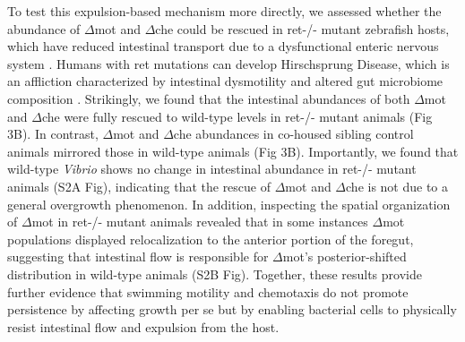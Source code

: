 To test this expulsion-based mechanism more directly, we assessed whether the abundance of $\Delta$mot and $\Delta$che could be rescued in ret-/- mutant zebrafish hosts, which have reduced intestinal transport due to a dysfunctional enteric nervous system \cite{wiles_host_2016,ganz_image_2018}. Humans with ret mutations can develop Hirschsprung Disease, which is an affliction characterized by intestinal dysmotility and altered gut microbiome composition \cite{gosain_hirschsprungs_2015,heanue_enteric_2007}. Strikingly, we found that the intestinal abundances of both $\Delta$mot and $\Delta$che were fully rescued to wild-type levels in ret-/- mutant animals (Fig 3B). In contrast, $\Delta$mot and $\Delta$che abundances in co-housed sibling control animals mirrored those in wild-type animals (Fig 3B). Importantly, we found that wild-type \textit{Vibrio} shows no change in intestinal abundance in ret-/- mutant animals (S2A Fig), indicating that the rescue of $\Delta$mot and $\Delta$che is not due to a general overgrowth phenomenon. In addition, inspecting the spatial organization of $\Delta$mot in ret-/- mutant animals revealed that in some instances $\Delta$mot populations displayed relocalization to the anterior portion of the foregut, suggesting that intestinal flow is responsible for $\Delta$mot's posterior-shifted distribution in wild-type animals (S2B Fig). Together, these results provide further evidence that swimming motility and chemotaxis do not promote persistence by affecting growth per se but by enabling bacterial cells to physically resist intestinal flow and expulsion from the host. 



